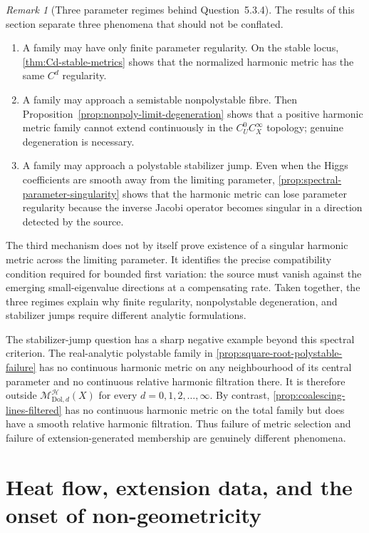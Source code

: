 \documentclass[11pt,reqno]{amsart}
\theoremstyle{definition}
\theoremstyle{remark}
\newtheorem{remark}[theorem]{Remark}
\newcommand{\cH}{\mathcal H}
\newcommand{\Dol}{\mathrm{Dol}}
\begin{document}
\begin{remark}[Three parameter regimes behind Question~5.3.4]\label{rem:three-parameter-regimes}
The results of this section separate three phenomena that should not be conflated.
\begin{enumerate}[label=(\roman*)]
\item A family may have only finite parameter regularity.  On the stable locus, \cref{thm:Cd-stable-metrics} shows that the normalized harmonic metric has the same $C^d$ regularity.
\item A family may approach a semistable nonpolystable fibre.  Then Proposition~\ref{prop:nonpoly-limit-degeneration} shows that a positive harmonic metric family cannot extend continuously in the $C^0_UC^\infty_X$ topology; genuine degeneration is necessary.
\item A family may approach a polystable stabilizer jump.  Even when the Higgs coefficients are smooth away from the limiting parameter, \cref{prop:spectral-parameter-singularity} shows that the harmonic metric can lose parameter regularity because the inverse Jacobi operator becomes singular in a direction detected by the source.
\end{enumerate}
The third mechanism does not by itself prove existence of a singular harmonic metric across the limiting parameter.  It identifies the precise compatibility condition required for bounded first variation: the source must vanish against the emerging small-eigenvalue directions at a compensating rate.  Taken together, the three regimes explain why finite regularity, nonpolystable degeneration, and stabilizer jumps require different analytic formulations.
\end{remark}

The stabilizer-jump question has a sharp negative example beyond this spectral criterion.  The real-analytic polystable family in \cref{prop:square-root-polystable-failure} has no continuous harmonic metric on any neighbourhood of its central parameter and no continuous relative harmonic filtration there.  It is therefore outside $\mathscr M_{\Dol,d}^{\cH}(X)$ for every $d=0,1,2,\ldots,\infty$.  By contrast, \cref{prop:coalescing-lines-filtered} has no continuous harmonic metric on the total family but does have a smooth relative harmonic filtration.  Thus failure of metric selection and failure of extension-generated membership are genuinely different phenomena.


\section{Heat flow, extension data, and the onset of non-geometricity}\label{sec:heat-flow-geometricity}
\end{document}
